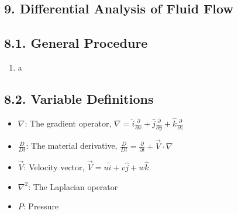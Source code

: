 \documentclass[10pt]{article}
\begin{document}
\begin{multicols*}{2}
\section*{9. Differential Analysis of Fluid Flow}
\subsection*{8.1. General Procedure}
\begin{enumerate}
    \item a
\end{enumerate}

\subsection*{8.2. Variable Definitions}
\begin{itemize}
    \item $\nabla$: The gradient operator, $\nabla = \hat{i} \frac{\partial}{\partial x} + \hat{j} \frac{\partial}{\partial y} + \hat{k} \frac{\partial}{\partial z}$
    \item $\frac{D}{Dt}$: The material derivative, $\frac{D}{Dt} = \frac{\partial}{\partial t} + \vec{V} \cdot \nabla$
    \item $\vec{V}$: Velocity vector, $\vec{V} = u \hat{i} + v \hat{j} + w \hat{k}$
    \item $\nabla^2$: The Laplacian operator
    \item $P$: Pressure
\end{itemize}


\end{multicols*}
\end{document}
